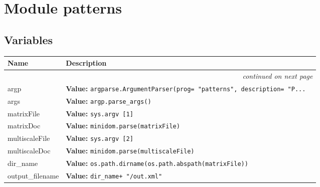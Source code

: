 %
%
%


\section{Module patterns}

    \label{patterns}


  \subsection{Variables}

    \vspace{-1cm}
\hspace{\varindent}\begin{longtable}{|p{\varnamewidth}|p{\vardescrwidth}|l}
\cline{1-2}
\cline{1-2} \centering \textbf{Name} & \centering \textbf{Description}& \\
\cline{1-2}
\endhead\cline{1-2}\multicolumn{3}{r}{\small\textit{continued on next page}}\\\endfoot\cline{1-2}
\endlastfoot\raggedright a\-r\-g\-p\- & \raggedright \textbf{Value:} 
{\tt argparse.ArgumentParser(prog= "patterns", description= "P\texttt{...}}&\\
\cline{1-2}
\raggedright a\-r\-g\-s\- & \raggedright \textbf{Value:} 
{\tt argp.parse\_args()}&\\
\cline{1-2}
\raggedright m\-a\-t\-r\-i\-x\-F\-i\-l\-e\- & \raggedright \textbf{Value:} 
{\tt sys.argv [1]}&\\
\cline{1-2}
\raggedright m\-a\-t\-r\-i\-x\-D\-o\-c\- & \raggedright \textbf{Value:} 
{\tt minidom.parse(matrixFile)}&\\
\cline{1-2}
\raggedright m\-u\-l\-t\-i\-s\-c\-a\-l\-e\-F\-i\-l\-e\- & \raggedright \textbf{Value:} 
{\tt sys.argv [2]}&\\
\cline{1-2}
\raggedright m\-u\-l\-t\-i\-s\-c\-a\-l\-e\-D\-o\-c\- & \raggedright \textbf{Value:} 
{\tt minidom.parse(multiscaleFile)}&\\
\cline{1-2}
\raggedright d\-i\-r\-\_\-n\-a\-m\-e\- & \raggedright \textbf{Value:} 
{\tt os.path.dirname(os.path.abspath(matrixFile))}&\\
\cline{1-2}
\raggedright o\-u\-t\-p\-u\-t\-\_\-f\-i\-l\-e\-n\-a\-m\-e\- & \raggedright \textbf{Value:} 
{\tt dir\_name+ "/out.xml"}&\\
\cline{1-2}
\end{longtable}

